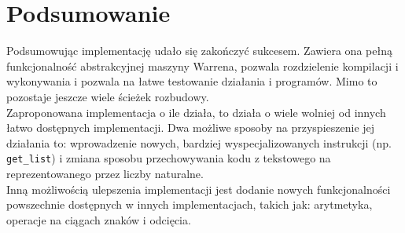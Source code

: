 \chapter{Podsumowanie}
\thispagestyle{chapterBeginStyle}

\iffalse
W podsumowanie należy określić stan zakończonych prac projektowych i implementacyjnych. Zaznaczyć, które z zakładanych funkcjonalności systemu udało się zrealizować. Omówić aspekty pielęgnacji systemu w środowisku wdrożeniowym. Wskazać dalsze możliwe kierunki rozwoju systemu, np.\ dodawanie nowych komponentów realizujących nowe funkcje.

W podsumowaniu należy podkreślić nowatorskie rozwiązania zastosowane w projekcie i implementacji (niebanalne algorytmy, nowe technologie, itp.).
\fi

Podsumowując implementację udało się zakończyć sukcesem. Zawiera ona pełną funkcjonalność abstrakcyjnej maszyny Warrena, pozwala rozdzielenie kompilacji i wykonywania i pozwala na łatwe testowanie działania i programów. Mimo to pozostaje jeszcze wiele ścieżek rozbudowy.\\
Zaproponowana implementacja o ile działa, to działa o wiele wolniej od innych łatwo dostępnych implementacji. Dwa możliwe sposoby na przyspieszenie jej działania to: wprowadzenie nowych, bardziej wyspecjalizowanych instrukcji (np. \texttt{get\_list}) i zmiana sposobu przechowywania kodu z tekstowego na reprezentowanego przez liczby naturalne.\\
Inną możliwością ulepszenia implementacji jest dodanie nowych funkcjonalności powszechnie dostępnych w innych implementacjach, takich jak: arytmetyka, operacje na ciągach znaków i odcięcia.
